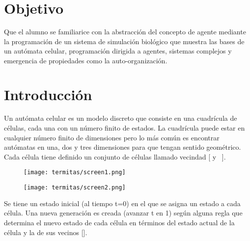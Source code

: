 

\section{Objetivo}
Que el alumno se familiarice con la abstracción del concepto de agente mediante la programación de un sistema de simulación biológico que muestra las bases de un autómata celular, programación dirigida a agentes, sistemas complejos y emergencia de propiedades como la auto-organización.\par


\begin{auxcode}
 \caption{Termitas}
 \centering
\end{auxcode}


\section{Introducci\'on}
\paragraph*{}
Un autómata celular es un modelo discreto que consiste en una cuadrícula de células, cada una con un número finito de estados. La cuadrícula puede estar en cualquier número finito de dimensiones pero lo más común es encontrar autómatas en una, dos y tres dimensiones para que tengan sentido geométrico. Cada célula tiene definido un conjunto de células llamado vecindad [ y ~].


\begin{figure}
  \centering
  \begin{minipage}{.5\textwidth}
    \centering
    \texttt{[image: termitas/screen1.png]}
    \label{fig:vecindadmoore}
  \end{minipage}%
  \begin{minipage}{.5\textwidth}
    \centering
    \texttt{[image: termitas/screen2.png]}
    \label{fig:vecindadneumann}
  \end{minipage}
\end{figure}

Se tiene un estado inicial (al tiempo t=0) en el que se asigna un estado a cada célula. Una nueva generación es creada (avanzar t en 1) según alguna regla que determina el nuevo estado de cada célula en términos del estado actual de la célula y la de sus vecinos [].

